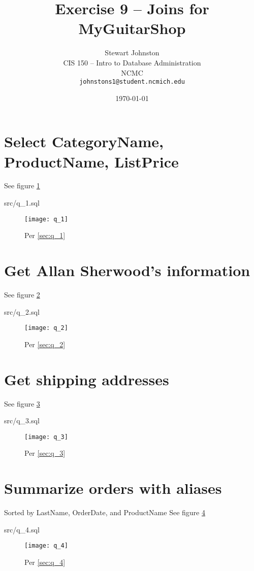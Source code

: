 \documentclass{article}
\title{Exercise 9 -- Joins for MyGuitarShop}
\author{Stewart Johnston\\
  {CIS 150 -- Intro to Database Administration}\\
  {NCMC}\\
  {\texttt{johnstons1@student.ncmich.edu}}
}
\date{\today}
\begin{document}

\maketitle

\tableofcontents
\listoffigures

\section{Select CategoryName, ProductName, ListPrice}
See figure \ref{fig:q_1}
\label{sec:q_1}
\begin{lstinputlisting}[float]{src/q_1.sql}
\end{lstinputlisting}
\begin{figure}[H]\centering
	\caption{Per \ref{sec:q_1}}
	\texttt{[image: q\_1]}
	\label{fig:q_1}
\end{figure}

\section{Get Allan Sherwood's information}
See figure \ref{fig:q_2}
\label{sec:q_2}
\begin{lstinputlisting}[float]{src/q_2.sql}
\end{lstinputlisting}
\begin{figure}[H]\centering
	\caption{Per \ref{sec:q_2}}
	\texttt{[image: q\_2]}
	\label{fig:q_2}
\end{figure}

\section{Get shipping addresses}
See figure \ref{fig:q_3}
\label{sec:q_3}
\begin{lstinputlisting}[float]{src/q_3.sql}
\end{lstinputlisting}
\begin{figure}[H]\centering
	\caption{Per \ref{sec:q_3}}
	\texttt{[image: q\_3]}
	\label{fig:q_3}
\end{figure}

\section{Summarize orders with aliases}
Sorted by LastName, OrderDate, and ProductName
See figure \ref{fig:q_4}
\label{sec:q_4}
\begin{lstinputlisting}[float]{src/q_4.sql}
\end{lstinputlisting}
\begin{figure}[H]\centering
	\caption{Per \ref{sec:q_4}}
	\texttt{[image: q\_4]}
	\label{fig:q_4}
\end{figure}
\end{document}
